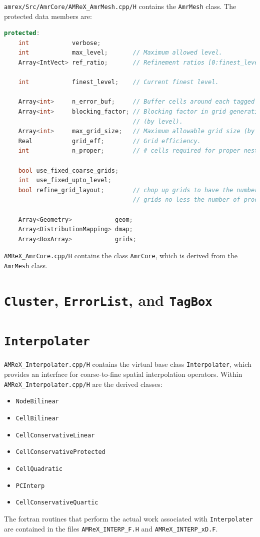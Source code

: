 {\tt amrex/Src/AmrCore/AMReX\_AmrMesh.cpp/H} contains the {\tt AmrMesh} class.
The protected data members are:
\begin{lstlisting}[language=cpp]
protected:
    int            verbose;
    int            max_level;       // Maximum allowed level.
    Array<IntVect> ref_ratio;       // Refinement ratios [0:finest_level-1]

    int            finest_level;    // Current finest level.

    Array<int>     n_error_buf;     // Buffer cells around each tagged cell.
    Array<int>     blocking_factor; // Blocking factor in grid generation 
                                    // (by level).
    Array<int>     max_grid_size;   // Maximum allowable grid size (by level).
    Real           grid_eff;        // Grid efficiency.
    int            n_proper;        // # cells required for proper nesting.

    bool use_fixed_coarse_grids;
    int  use_fixed_upto_level;
    bool refine_grid_layout;        // chop up grids to have the number of 
                                    // grids no less the number of procs

    Array<Geometry>            geom;
    Array<DistributionMapping> dmap;
    Array<BoxArray>            grids;    
\end{lstlisting}

{\tt AMReX\_AmrCore.cpp/H} contains the class {\tt AmrCore}, which is derived from
the {\tt AmrMesh} class.

\section{{\tt Cluster}, {\tt ErrorList}, and {\tt TagBox}}

\section{{\tt Interpolater}}

{\tt AMReX\_Interpolater.cpp/H} contains the virtual base class {\tt Interpolater}, which provides
an interface for coarse-to-fine spatial interpolation operators.  Within {\tt AMReX\_Interpolater.cpp/H}
are the derived classes:
\begin{itemize}
\item {\tt NodeBilinear}
\item {\tt CellBilinear}
\item {\tt CellConservativeLinear}
\item {\tt CellConservativeProtected}
\item {\tt CellQuadratic}
\item {\tt PCInterp}
\item {\tt CellConservativeQuartic}
\end{itemize}
The fortran routines that perform the actual work associated with {\tt Interpolater} are 
contained in the files {\tt AMReX\_INTERP\_F.H} and {\tt AMReX\_INTERP\_xD.F}.

